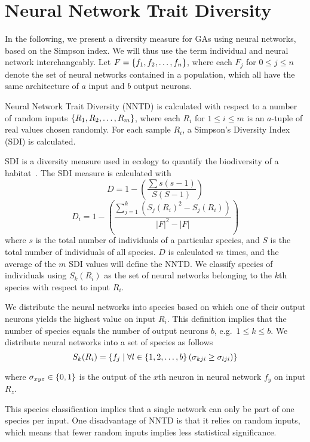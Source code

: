 \section{Neural Network Trait Diversity}
In the following, we present a diversity measure for GAs using neural networks, based on the Simpson index. We will thus use the term individual and neural network interchangeably. Let $F = \left\{ f_1, f_2, \dots, f_n \right\}$, where each $F_j$ for $0 \leq j \leq n$ denote the set of neural networks contained in a population, which all have the same architecture of $a$ input and $b$ output neurons. 

Neural Network Trait Diversity (NNTD) is calculated with respect to a number of random inputs $\left\{ R_1, R_2, \dots, R_m \right\}$, where each $R_i$ for $1 \leq i \leq m$ is an $a$-tuple of real values chosen randomly. For each sample $R_i$, a Simpson's Diversity Index (SDI) is calculated.

SDI is a diversity measure used in ecology to quantify the biodiversity of a habitat~\cite{simpson1949measurement}. The SDI measure is calculated with 
%
\begin{equation*}\label{eq:sdi}
  D = 1 - \left(\frac{\sum{s (s - 1)}}{S (S - 1)}\right) 
\end{equation*}
%
\begin{equation*}\label{eq:sdi2}
  D_i = 1 - \left(\frac{\sum_{j=1}^{k}\left(S_j\left(R_i\right)^2 - S_j(R_i)\right)}{\lvert F\rvert^2 - \lvert F\rvert}\right) 
\end{equation*}
%
where $s$ is the total number of individuals of a particular species, and $S$ is the total number of individuals of all species. $D$ is calculated $m$ times, and the average of the $m$ SDI values will define the NNTD. We classify species of individuals using $S_k(R_i)$ as the set of neural networks belonging to the $k$th species with respect to input $R_i$.

We distribute the neural networks into species based on which one of their output neurons yields the highest value on input $R_i$. %
This definition implies that the number of species equals the number of output neurons $b$, e.g.\ $1 \leq k \leq b$. We distribute neural networks into a set of species as follows
%
\begin{equation*}\label{eq:species}
  S_k(R_i) = \left\{ f_j \mid \forall l \in \left\{ 1, 2, \dots, b \right\} \left(\sigma_{kji} \geq \sigma_{lji}\right) \right\}
\end{equation*}
%

where $\sigma_{xyz} \in \left\{ 0, 1 \right\}$ is the output of the $x$th neuron in neural network $f_y$ on input $R_z$.

This species classification implies that a single network can only be part of one species per input. One disadvantage of NNTD is that it relies on random inputs, which means that fewer random inputs implies less statistical significance.
